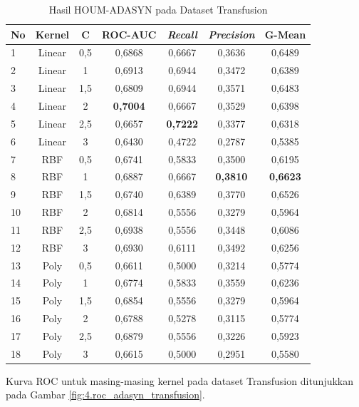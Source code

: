 \begin{table}[H]
\centering
\caption{Hasil HOUM-ADASYN pada Dataset Transfusion}
\label{table:4.adasyn_transfusion}
\footnotesize
\begin{tabular}{|l|c|c|c|c|c|c|}
\hline
\textbf{No} & \textbf{Kernel} & \textbf{C} & \textbf{ROC-AUC} & \textbf{\textit{Recall}} & \textbf{\textit{Precision}} & \textbf{G-Mean} \\
\hline
1 & Linear & 0,5 & 0,6868 & 0,6667 & 0,3636 & 0,6489 \\
\hline
2 & Linear & 1 & 0,6913 & 0,6944 & 0,3472 & 0,6389 \\
\hline
3 & Linear & 1,5 & 0,6809 & 0,6944 & 0,3571 & 0,6483 \\
\hline
4 & Linear & 2 & \textbf{0,7004} & 0,6667 & 0,3529 & 0,6398 \\
\hline
5 & Linear & 2,5 & 0,6657 & \textbf{0,7222} & 0,3377 & 0,6318 \\
\hline
6 & Linear & 3 & 0,6430 & 0,4722 & 0,2787 & 0,5385 \\
\hline
7 & RBF & 0,5 & 0,6741 & 0,5833 & 0,3500 & 0,6195 \\
\hline
8 & RBF & 1 & 0,6887 & 0,6667 & \textbf{0,3810} & \textbf{0,6623} \\
\hline
9 & RBF & 1,5 & 0,6740 & 0,6389 & 0,3770 & 0,6526 \\
\hline
10 & RBF & 2 & 0,6814 & 0,5556 & 0,3279 & 0,5964 \\
\hline
11 & RBF & 2,5 & 0,6938 & 0,5556 & 0,3448 & 0,6086 \\
\hline
12 & RBF & 3 & 0,6930 & 0,6111 & 0,3492 & 0,6256 \\
\hline
13 & Poly & 0,5 & 0,6611 & 0,5000 & 0,3214 & 0,5774 \\
\hline
14 & Poly & 1 & 0,6774 & 0,5833 & 0,3559 & 0,6236 \\
\hline
15 & Poly & 1,5 & 0,6854 & 0,5556 & 0,3279 & 0,5964 \\
\hline
16 & Poly & 2 & 0,6788 & 0,5278 & 0,3115 & 0,5774 \\
\hline
17 & Poly & 2,5 & 0,6879 & 0,5556 & 0,3226 & 0,5923 \\
\hline
18 & Poly & 3 & 0,6615 & 0,5000 & 0,2951 & 0,5580 \\
\hline
\end{tabular}
\end{table}

Kurva ROC untuk masing-masing kernel pada dataset Transfusion ditunjukkan pada Gambar \ref{fig:4.roc_adasyn_transfusion}.

